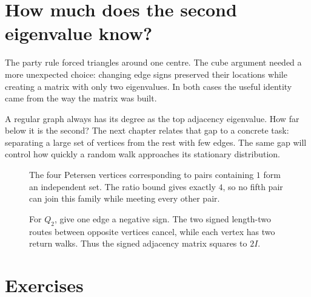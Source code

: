 \section{How much does the second eigenvalue know?}

The party rule forced triangles around one centre. The cube argument needed a more unexpected choice: changing edge signs preserved their locations while creating a matrix with only two eigenvalues. In both cases the useful identity came from the way the matrix was built.

A regular graph always has its degree as the top adjacency eigenvalue. How far below it is the second? The next chapter relates that gap to a concrete task: separating a large set of vertices from the rest with few edges. The same gap will control how quickly a random walk approaches its stationary distribution.

\begin{figure}[ht]
\centering{}
\caption{The four Petersen vertices corresponding to pairs containing $1$ form an independent set. The ratio bound gives exactly $4$, so no fifth pair can join this family while meeting every other pair.}
\label{fig:v8c05ratio}
\end{figure}
\begin{figure}[ht]
\centering{}
\caption{For $Q_2$, give one edge a negative sign. The two signed length-two routes between opposite vertices cancel, while each vertex has two return walks. Thus the signed adjacency matrix squares to $2I$.}
\label{fig:v8c05signs}
\end{figure}

\section{Exercises}

